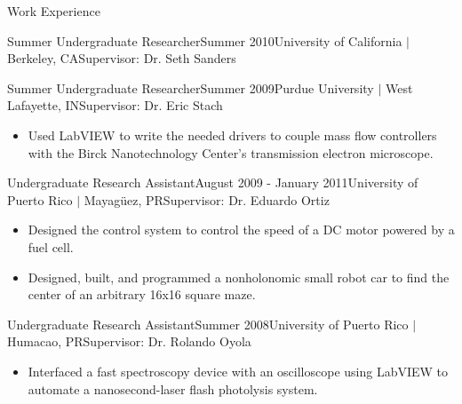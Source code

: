 \documentclass{resume} %
\begin{document}
\begin{rSection}{Work Experience}
\begin{rSubsection}{Summer Undergraduate Researcher}{Summer 2010}{University of California $\vert$ Berkeley, CA}{Supervisor: Dr. Seth Sanders}
\end{rSubsection}


\begin{rSubsection}{Summer Undergraduate Researcher}{Summer 2009}{Purdue University $\vert$ West Lafayette, IN}{Supervisor: Dr. Eric Stach}

\item
\begin{itemize}
\item Used LabVIEW to write the needed drivers to couple mass flow controllers
  with the Birck Nanotechnology Center's transmission electron microscope.
\end{itemize}

\end{rSubsection}


\begin{rSubsection}{Undergraduate Research Assistant}{August 2009 - January 2011}{University of Puerto Rico $\vert$ Mayag\"{u}ez, PR}{Supervisor: Dr. Eduardo Ortiz}

\item
\begin{itemize}
\item Designed the control system to control the speed of a DC motor powered by
  a fuel cell.
\item Designed, built, and programmed a nonholonomic small robot car to find the
  center of an arbitrary 16x16 square maze.
\end{itemize}

\end{rSubsection}


\begin{rSubsection}{Undergraduate Research Assistant}{Summer 2008}{University of Puerto Rico $\vert$ Humacao, PR}{Supervisor: Dr. Rolando Oyola}

\item
\begin{itemize}
\item Interfaced a fast spectroscopy device with an oscilloscope using LabVIEW
  to automate a nanosecond-laser flash photolysis system.
\end{itemize}

\end{rSubsection}


\end{rSection}
\end{document}
